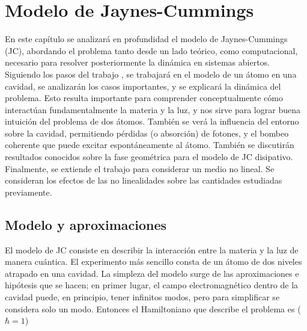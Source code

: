 \chapter{Modelo de Jaynes-Cummings}
\label{ch3_jcm}


\pagestyle{fancy}
\fancyhf{}
\fancyhead[LE]{\nouppercase{\rightmark\hfill}}
\fancyhead[RO]{\nouppercase{\leftmark\hfill}}
\fancyfoot[LE,RO]{\hfill\thepage\hfill}

En este capítulo se analizará en profundidad el modelo de Jaynes-Cummings (JC), abordando el problema tanto desde un lado te\'orico, como computacional, necesario para resolver posteriormente la din\'amica en sistemas abiertos. Siguiendo los pasos del trabajo \cite{TesisViotti}, se trabajar\'a en el modelo de un átomo en una cavidad, se analizar\'an los casos importantes, y se explicará la din\'amica del problema. Esto resulta importante para comprender conceptualmente cómo interact\'uan fundamentalmente la materia y la luz, y nos sirve para lograr buena intuici\'on del problema de dos átomos. También se ver\'a la influencia del entorno sobre la cavidad, permitiendo pérdidas (o absorci\'on) de fotones, y el bombeo coherente que puede excitar espontáneamente al átomo.  
También se discutirán resultados conocidos sobre la fase geométrica para el modelo de JC disipativo. Finalmente, se extiende el trabajo para considerar un medio no lineal. Se consideran los efectos de las no linealidades sobre las cantidades estudiadas previamente.
\newline

\section{Modelo y aproximaciones}
El modelo de JC consiste en describir la interacción entre la materia y la luz de manera cuántica. El experimento más sencillo consta de un átomo de dos niveles atrapado en una cavidad. La simpleza del modelo surge de las aproximaciones e hipótesis que se hacen; en primer lugar, el campo electromagnético dentro de la cavidad puede, en principio, tener infinitos modos, pero para simplificar se considera solo un modo. 
Entonces el Hamiltoniano que describe el problema es ($\hbar = 1$)

